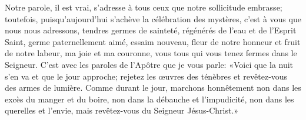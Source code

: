 Notre parole, il est vrai, s’adresse à tous ceux que notre sollicitude embrasse;
	toutefois, puisqu’aujourd’hui s’achève la célébration des mystères,
	c’est à vous que nous nous adressons, tendres germes de sainteté,
	régénérés de l’eau et de l’Esprit Saint,
	germe paternellement aimé, essaim nouveau,
	fleur de notre honneur et fruit de notre labeur, ma joie et ma couronne,
	vous tous qui vous tenez fermes dans le Seigneur.
C’est avec les paroles de l’Apôtre que je vous parle:
	«Voici que la nuit s’en va et que le jour approche;
	rejetez les œuvres des ténèbres et revêtez-vous des armes de lumière.
Comme durant le jour, marchons honnêtement
	non dans les excès du manger et du boire,
	non dans la débauche et l’impudicité,
	non dans les querelles et l’envie,
	mais revêtez-vous du Seigneur Jésus-Christ.»

